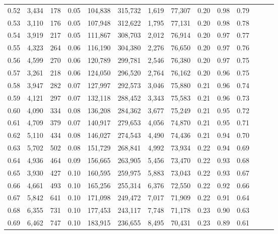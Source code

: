 \begin{tabular}{rrrrrrrrrrrrrr}
0.52 &   3,434 &    178 &  0.05 &  104,838 &  315,732 &   1,619 &  77,307 &  0.20 &  0.98 &      0.79 \\
0.53 &   3,110 &    176 &  0.05 &  107,948 &  312,622 &   1,795 &  77,131 &  0.20 &  0.98 &      0.78 \\
0.54 &   3,919 &    217 &  0.05 &  111,867 &  308,703 &   2,012 &  76,914 &  0.20 &  0.97 &      0.77 \\
0.55 &   4,323 &    264 &  0.06 &  116,190 &  304,380 &   2,276 &  76,650 &  0.20 &  0.97 &      0.76 \\
0.56 &   4,599 &    270 &  0.06 &  120,789 &  299,781 &   2,546 &  76,380 &  0.20 &  0.97 &      0.75 \\
0.57 &   3,261 &    218 &  0.06 &  124,050 &  296,520 &   2,764 &  76,162 &  0.20 &  0.96 &      0.75 \\
0.58 &   3,947 &    282 &  0.07 &  127,997 &  292,573 &   3,046 &  75,880 &  0.21 &  0.96 &      0.74 \\
0.59 &   4,121 &    297 &  0.07 &  132,118 &  288,452 &   3,343 &  75,583 &  0.21 &  0.96 &      0.73 \\
0.60 &   4,090 &    334 &  0.08 &  136,208 &  284,362 &   3,677 &  75,249 &  0.21 &  0.95 &      0.72 \\
0.61 &   4,709 &    379 &  0.07 &  140,917 &  279,653 &   4,056 &  74,870 &  0.21 &  0.95 &      0.71 \\
0.62 &   5,110 &    434 &  0.08 &  146,027 &  274,543 &   4,490 &  74,436 &  0.21 &  0.94 &      0.70 \\
0.63 &   5,702 &    502 &  0.08 &  151,729 &  268,841 &   4,992 &  73,934 &  0.22 &  0.94 &      0.69 \\
0.64 &   4,936 &    464 &  0.09 &  156,665 &  263,905 &   5,456 &  73,470 &  0.22 &  0.93 &      0.68 \\
0.65 &   3,930 &    427 &  0.10 &  160,595 &  259,975 &   5,883 &  73,043 &  0.22 &  0.93 &      0.67 \\
0.66 &   4,661 &    493 &  0.10 &  165,256 &  255,314 &   6,376 &  72,550 &  0.22 &  0.92 &      0.66 \\
0.67 &   5,842 &    641 &  0.10 &  171,098 &  249,472 &   7,017 &  71,909 &  0.22 &  0.91 &      0.64 \\
0.68 &   6,355 &    731 &  0.10 &  177,453 &  243,117 &   7,748 &  71,178 &  0.23 &  0.90 &      0.63 \\
0.69 &   6,462 &    747 &  0.10 &  183,915 &  236,655 &   8,495 &  70,431 &  0.23 &  0.89 &      0.61 \\

\end{tabular}
